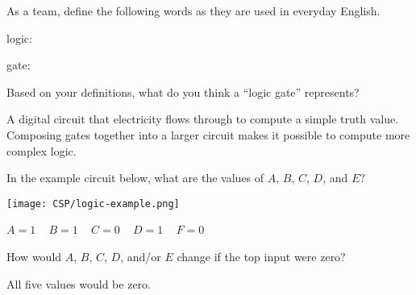 \Q As a team, define the following words as they are used in everyday English.

\begin{description}
\item logic: 
\item gate: 
\end{description}


\Q Based on your definitions, what do you think a ``logic gate'' represents?

\begin{answer}
A digital circuit that electricity flows through to compute a simple truth value.
Composing gates together into a larger circuit makes it possible to compute more complex logic.
\end{answer}


\Q In the example circuit below, what are the values of $A$, $B$, $C$, $D$, and $E$?

\vspace{1em}
\begin{minipage}{0.45\textwidth}
\texttt{[image: CSP/logic-example.png]}
\end{minipage}
\hspace{1em}
\begin{minipage}{0.45\textwidth}
\begin{answer}
$A=1$ ~ $B=1$ ~ $C=0$ ~ $D=1$ ~ $F=0$ ~
\end{answer}
\end{minipage}
\vspace{1em}


\Q How would $A$, $B$, $C$, $D$, and/or $E$ change if the top input were zero?

\begin{answer}
All five values would be zero.
\end{answer}
